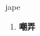 
\begin{frame}
{\huge jape}
\begin{center}
\begin{enumerate}\Large
  \item \textbf{嘲弄}
\end{enumerate}
\end{center}
\end{frame}
